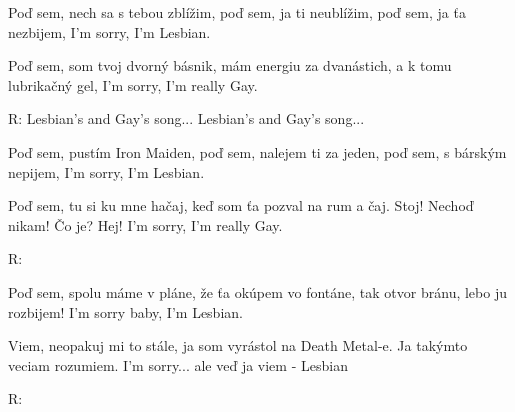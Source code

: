 \resetVars
{}
\MakeHeader
\Lyrics

Poď sem, nech sa s tebou zblížim, poď sem, ja ti neublížim,
poď sem, ja ťa nezbijem, I'm sorry, I'm Lesbian.

Poď sem, som tvoj dvorný básnik, mám energiu za dvanástich,
a k tomu lubrikačný gel, I'm sorry, I'm really Gay.

R: Lesbian's and Gay's song...
Lesbian's and Gay's song...

Poď sem, pustím Iron Maiden, poď sem, nalejem ti za jeden,
poď sem, s bárským nepijem, I'm sorry, I'm Lesbian.

Poď sem, tu si ku mne hačaj, keď som ťa pozval na rum a čaj.
Stoj! Nechoď nikam! Čo je? Hej! I'm sorry, I'm really Gay.

R:

Poď sem, spolu máme v pláne, že ťa okúpem vo fontáne,
tak otvor bránu, lebo ju rozbijem! I'm sorry baby, I'm Lesbian.

Viem, neopakuj mi to stále, ja som vyrástol na Death Metal-e.
Ja takýmto veciam rozumiem. I'm sorry... ale veď ja viem - Lesbian

R:

\Next
